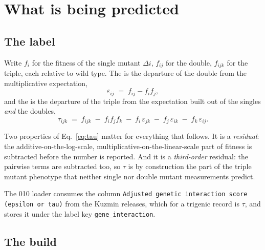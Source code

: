 
\section{What is being predicted}
\label{sec:label}

\subsection{The label}

Write $f_i$ for the fitness of the single mutant $\Delta i$, $f_{ij}$ for the
double, $f_{ijk}$ for the triple, each relative to wild type. The
 is the departure of the double from the
multiplicative expectation,
%
\begin{equation}
  \varepsilon_{ij} \;=\; f_{ij} - f_i f_j ,
  \label{eq:epsilon}
\end{equation}
%
and the  is the departure of the triple from
the expectation built out of the singles \emph{and} the doubles,
%
\begin{equation}
  \tau_{ijk} \;=\; f_{ijk}
  \;-\; f_i f_j f_k
  \;-\; f_i\,\varepsilon_{jk}
  \;-\; f_j\,\varepsilon_{ik}
  \;-\; f_k\,\varepsilon_{ij} .
  \label{eq:tau}
\end{equation}
%

Two properties of Eq.~\ref{eq:tau} matter for everything that follows. It is a
\emph{residual}: the additive-on-the-log-scale, multiplicative-on-the-linear-scale
part of fitness is subtracted before the number is reported. And it is a
\emph{third-order} residual: the pairwise terms are subtracted too, so $\tau$ is
by construction the part of the triple mutant phenotype that neither single nor
double mutant measurements predict.

The 010 loader consumes the column \texttt{Adjusted genetic interaction score
(epsilon or tau)} from the Kuzmin releases, which for a trigenic record is
$\tau$, and stores it under the label key \texttt{gene\_interaction}.

\subsection{The build}

